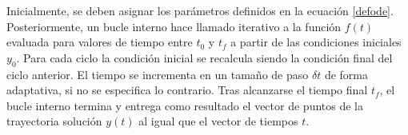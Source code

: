 Inicialmente, se deben asignar los parámetros definidos en la ecuación \eqref{defode}.\\

Posteriormente, un bucle interno hace llamado iterativo a la función $f(t)$ evaluada para valores de tiempo entre $t_0$ y $t_f$ a partir de las condiciones iniciales $y_0$. Para cada ciclo la condición inicial se recalcula siendo la condición final del ciclo anterior. El tiempo se incrementa en un tamaño de paso $\delta t$ de forma adaptativa, si no se especifica lo contrario. Tras alcanzarse el tiempo final $t_f$, el bucle interno termina y entrega como resultado el vector de puntos de la trayectoria solución $y(t)$ al igual que el vector de tiempos $t$. 